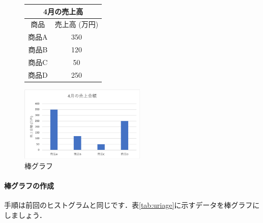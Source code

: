 \begin{figure}[htbp]
    \begin{minipage}{0.5\hsize}
        \centering
        \makeatletter
        \def\@captype{table}
        \makeatother
        \caption{}
        \begin{tabular}{|c|c|}
          \hline
          \multicolumn{2}{|c|}{4月の売上高}\\ \hline
          商品  & 売上高 (万円) \\ \hline
          商品A & 350 \\ \hline
          商品B & 120 \\ \hline
          商品C & 50 \\ \hline
          商品D & 250 \\ \hline
        \end{tabular}
        \label{tab:uriage}
    \end{minipage}
    \begin{minipage}{0.5\hsize}
        \centering
        \includegraphics[width=6cm]{chap2/bar.png}
        \caption{棒グラフ}
        \label{fig:bar}
    \end{minipage}
\end{figure}

\paragraph{棒グラフの作成}

手順は前回のヒストグラムと同じです．表\ref{tab:uriage}に示すデータを棒グラフにしましょう．

